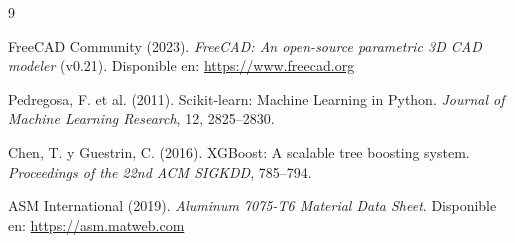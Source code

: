 \documentclass[11pt, a4paper]{article}
\begin{document}
\newpage
\begin{thebibliography}{9}

FreeCAD Community (2023).
\textit{FreeCAD: An open-source parametric 3D CAD modeler} (v0.21).
Disponible en: \url{https://www.freecad.org}

Pedregosa, F. et al. (2011).
Scikit-learn: Machine Learning in Python.
\textit{Journal of Machine Learning Research}, 12, 2825--2830.

Chen, T. y Guestrin, C. (2016).
XGBoost: A scalable tree boosting system.
\textit{Proceedings of the 22nd ACM SIGKDD}, 785--794.

ASM International (2019).
\textit{Aluminum 7075-T6 Material Data Sheet}.
Disponible en: \url{https://asm.matweb.com}

\end{thebibliography}
\end{document}
